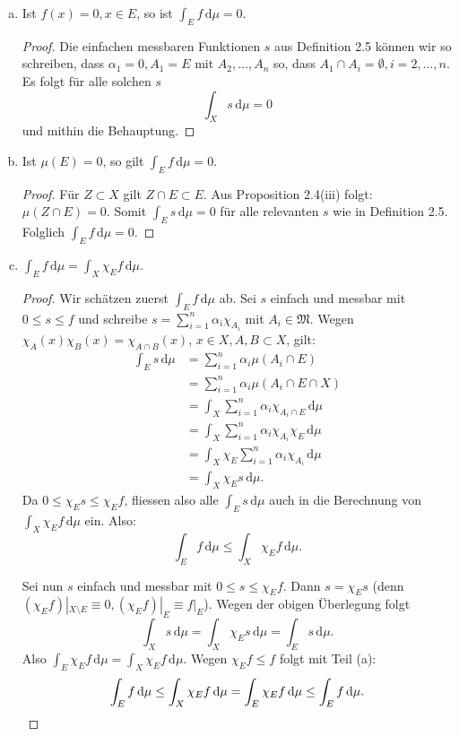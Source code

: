 \documentclass[10pt]{article}\usepackage[]{graphicx}\usepackage[]{color}
\newcommand{\df}{\,\textrm{d}}
\begin{document}
\begin{enumerate}[(a)]
  \item Ist $f(x) = 0, x \in E$, so ist $\int_E f \df \mu = 0$.
  \begin{proof}
    Die einfachen messbaren Funktionen $s$ aus Definition 2.5
    können wir so schreiben, dass $\alpha_1 = 0, A_1 = E$
    mit $A_2, \dots, A_n$ so, dass $A_1 \cap A_i = \emptyset, i = 2, \dots, n$.
    Es folgt für alle solchen $s$
    \[\int_X s \df \mu = 0\]
    und mithin die Behauptung.
  \end{proof}
  
  \item Ist $\mu(E) = 0$, so gilt $\int_E f \df \mu = 0$.
  \begin{proof}
    Für $Z \subset X$ gilt $Z \cap E \subset E$.
    Aus Proposition 2.4(iii) folgt: $\mu(Z \cap E) = 0$.
    Somit $\int_E s \df \mu = 0$ für alle
    relevanten $s$ wie in Definition 2.5.
    Folglich $\int_E f \df \mu = 0$.
  \end{proof}
  
  \item $\int_E f \df \mu = \int_X \chi_E f \df \mu$.
  \begin{proof}
  Wir schätzen zuerst $\int_E f \df \mu$ ab.
  Sei $s$ einfach und messbar mit $0 \leq s \leq f$
  und schreibe $s = \sum_{i = 1}^n \alpha_i \chi_{A_i}$
  mit $A_i \in \mathfrak{M}$.
  Wegen $\chi_A(x)\chi_B(x) = \chi_{A\cap B}(x)$,
  $x \in X, A,B \subset X$, gilt:
  \begin{align*}
    \int_E s \df \mu 
    &= \sum_{i=1}^n \alpha_i \mu(A_i \cap E) \\
    &= \sum_{i=1}^n \alpha_i \mu(A_i \cap E \cap X) \\
    &= \int_X \sum_{i = 1}^n \alpha_i \chi_{A_i \cap E} \df \mu \\
    &= \int_X \sum_{i = 1}^n \alpha_i \chi_{A_i} \chi_E \df \mu \\
    &= \int_X \chi_E  \sum_{i = 1}^n \alpha_i \chi_{A_i} \df \mu \\
    &= \int_X \chi_E s \df \mu.
  \end{align*}
  Da $0 \leq \chi_E s \leq \chi_E f$, fliessen also alle
  $\int_E s \df \mu$ auch in die Berechnung von
  $\int_X \chi_E f \df \mu$ ein. Also:
  \[
    \int_E f \df \mu \leq \int_X \chi_E f \df \mu.
  \]
  
  Sei nun $s$ einfach und messbar mit $0 \leq s \leq \chi_E f$.
  Dann $s = \chi_E s$ (denn $(\chi_E f)|_{X \setminus E} \equiv 0, (\chi_E f)|_{E} \equiv f|_{E}$).
  Wegen der obigen Überlegung folgt
  \[
    \int_X s \df \mu = \int_X \chi_E s \df \mu = \int_E s \df \mu.
  \]
  Also $\int_E \chi_E f \df \mu = \int_X \chi_E f \df \mu.$
  Wegen $\chi_E f \leq f$ folgt mit Teil (a):
  \[
    \int_E f \df \mu \leq \int_X \chi_E f \df \mu = \int_E \chi_E f \df \mu \leq \int_E f \df \mu.\qedhere
  \]
  \end{proof}
\end{enumerate}
\end{document}
